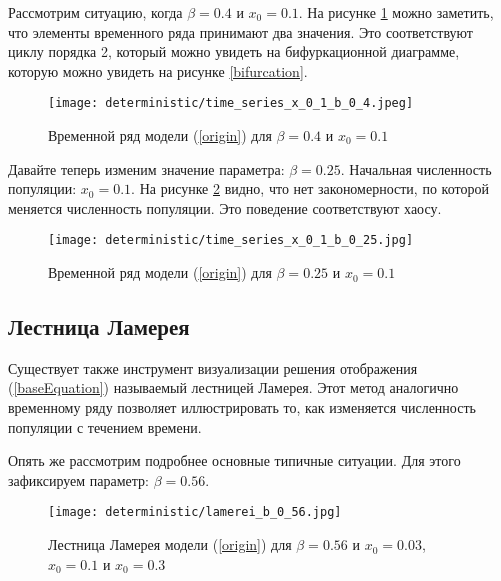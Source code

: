         Рассмотрим ситуацию, когда \(\beta = 0.4\) и \(x_0 = 0.1\). На рисунке \ref{time_series_x_0_1_b_0_4} можно заметить, что элементы временного ряда принимают два значения. Это соответствуют циклу порядка 2, который можно увидеть на бифуркационной диаграмме, которую можно увидеть на рисунке \ref{bifurcation}.
    
        \begin{figure}
            \centering
            \texttt{[image: deterministic/time\_series\_x\_0\_1\_b\_0\_4.jpeg]}

            \captionsetup{justification=centering}
            \caption{Временной ряд модели (\ref{origin}) для \(\beta = 0.4\) и \(x_0 = 0.1\)}
            \label{time_series_x_0_1_b_0_4}
        \end{figure}

        Давайте теперь изменим значение параметра: \(\beta = 0.25\). Начальная численность популяции: \(x_0 = 0.1\). На рисунке \ref{time_series_x_0_1_b_0_25} видно, что нет закономерности, по которой меняется численность популяции. Это поведение соответствуют хаосу.
    
        \begin{figure}
            \centering
            \texttt{[image: deterministic/time\_series\_x\_0\_1\_b\_0\_25.jpg]}

            \captionsetup{justification=centering}
            \caption{Временной ряд модели (\ref{origin}) для \(\beta = 0.25\) и \(x_0 = 0.1\)}
            \label{time_series_x_0_1_b_0_25}
        \end{figure}

    \subsection{Лестница Ламерея}
    
        Существует также инструмент визуализации решения отображения (\ref{baseEquation}) называемый лестницей Ламерея. Этот метод аналогично временному ряду позволяет иллюстрировать то, как изменяется численность популяции с течением времени.
            
        Опять же рассмотрим подробнее основные типичные ситуации. Для этого зафиксируем параметр: \(\beta = 0.56\). 
    
        \begin{figure}
            \centering
            \texttt{[image: deterministic/lamerei\_b\_0\_56.jpg]}
    
            \captionsetup{justification=centering}
            \caption{Лестница Ламерея модели (\ref{origin}) для \(\beta = 0.56\) и \(x_0 = 0.03\), \(x_0 = 0.1\) и \(x_0 = 0.3\)}
            \label{lamerei_b_0_56}
        \end{figure}
    
